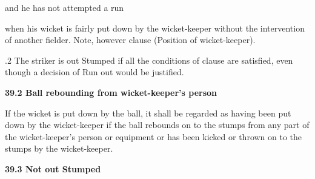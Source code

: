 \documentclass[12pt]{article}
\begin{document}
\vspace{\baselineskip}
\begin{adjustwidth}{0.5in}{0.0in}
{\fontsize{9pt}{10.8pt}\selectfont and he has not attempted a run\par}\par

\end{adjustwidth}


\vspace{\baselineskip}
\begin{adjustwidth}{0.5in}{0.32in}
{\fontsize{9pt}{10.8pt}\selectfont when his wicket is fairly put down by the wicket-keeper without the intervention of another fielder. Note, however clause (Position of wicket-keeper).\par}\par

\end{adjustwidth}


\vspace{\baselineskip}
\begin{adjustwidth}{0.5in}{0.1in}
{\fontsize{9pt}{10.8pt}.2 \tabto{0.49in} The striker is out Stumped if all the conditions of clause are satisfied, even though a decision of Run out would be justified.\par}\par

\end{adjustwidth}


\vspace{\baselineskip}
{\fontsize{11pt}{13.2pt}\selectfont \textbf{39.2 \tabto{0.47in} Ball rebounding from wicket-keeper’s person}\par}\par


\vspace{\baselineskip}
\begin{adjustwidth}{0.0in}{0.01in}
{\fontsize{9pt}{10.8pt}\selectfont If the wicket is put down by the ball, it shall be regarded as having been put down by the wicket-keeper if the ball rebounds on to the stumps from any part of the wicket-keeper’s person or equipment or has been kicked or thrown on to the stumps by the wicket-keeper.\par}\par

\end{adjustwidth}


\vspace{\baselineskip}
{\fontsize{11pt}{13.2pt}\selectfont \textbf{39.3 \tabto{0.47in} Not out Stumped}\par}\par
\end{document}
